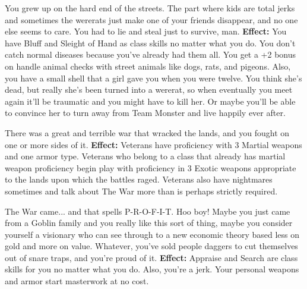 \medskip{}
{You grew up on the hard end of the streets. The part where kids are total jerks and sometimes the wererats just make one of your friends disappear, and no one else seems to care. You had to lie and steal just to survive, man.}
\textbf{Effect:}{ You have Bluff and Sleight of Hand as class skills no matter what you do. You don't catch normal diseases because you've already had them all. You get a +2 bonus on handle animal checks with street animals like dogs, rats, and pigeons. Also, you have a small shell that a girl gave you when you were twelve. You think she's dead, but really she's been turned into a wererat, so when eventually you meet again it'll be traumatic and you might have to kill her. Or maybe you'll be able to convince her to turn away from Team Monster and live happily ever after.}

\medskip{}
{There was a great and terrible war that wracked the lands, and you fought on one or more sides of it.}
\textbf{Effect:}{ Veterans have proficiency with 3 Martial weapons and one armor type. Veterans who belong to a class that already has martial weapon proficiency begin play with proficiency in 3 Exotic weapons appropriate to the lands upon which the battles raged. Veterans also have nightmares sometimes and talk about The War more than is perhaps strictly required.}

\medskip{}
{The War came... and that spells P-R-O-F-I-T. Hoo boy! Maybe you just came from a Goblin family and you really like this sort of thing, maybe you consider yourself a visionary who can see through to a new economic theory based less on gold and more on value. Whatever, you've sold people daggers to cut themselves out of snare traps, and you're proud of it.}
\textbf{Effect:}{ Appraise and Search are class skills for you no matter what you do. Also, you're a jerk. Your personal weapons and armor start masterwork at no cost.}
